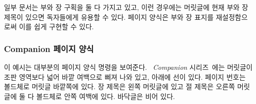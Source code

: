 일부 문서는 부와 장 구획을 둘 다 가지고 있고, 이런 경우에는 머릿글에 현재 부와
장 제목이 있으면 독자들에게 유용할 수 있다.
 페이지 양식은 부와 장 표지를 재설정함으로써 이를 쉽게 구현할
수 있다.
\begin{lcode}
\end{lcode}
  

\subsubsection{Companion 페이지 양식}

이 예시는 대부분의 페이지 양식 명령을 보여준다.
\textit{\ltx\ Companion} 시리즈~\cite{COMPANION,GCOMPANION,WCOMPANION}에는
머릿글이 조판 영역보다 넓어 바깥
여백으로 삐져 나와 있고, 아래에 선이 있다.
페이지 번호는 볼드체로 머릿글 바깥쪽에 있다.
장 제목은 왼쪽 머릿글에 있고 절 제목은 오른쪽
머릿글에 둘 다 볼드체로 안쪽
여백에 있다.
바닥글은 비어 있다.

